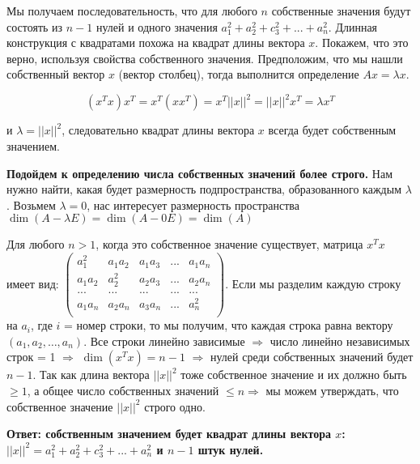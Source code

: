 \documentclass[a4paper,12pt]{article}
\renewcommand{\leq}{\leqslant}
\renewcommand{\geq}{\geqslant}
\begin{document}
\begin{enumerate}
Мы получаем последовательность, что для любого $n$ собственные значения будут состоять из $n-1$ нулей и одного значения $a_1^2 + a_2^2 + c_3^2+...+a^2_n$.
Длинная конструкция с квадратами похожа на квадрат длины вектора $x$. Покажем, что это верно, используя свойства собственного значения. Предположим, что мы нашли собственный вектор $x$ (вектор столбец), тогда выполнится определение $Ax=\lambda x$.


$$(x^Tx)x^T = x^T(xx^T)=x^T{||x||}^2={||x||}^2x^T=\lambda x^T$$

и $\lambda={||x||}^2$, следовательно квадрат длины вектора $x$ всегда будет собственным значением.

\textbf{Подойдем к определению числа собственных значений более строго.}
Нам нужно найти, какая будет размерность подпространства, образованного каждым $\lambda$. Возьмем $\lambda = 0$, нас интересует размерность пространства $\dim (A - \lambda E)= \dim (A - 0 E)=\dim (A)$

Для любого $n>1$, когда это собственное значение существует, матрица $x^T x$ имеет вид: $\begin{pmatrix}
a_1^2&a_1 a_2&a_1 a_3& ... & a_1 a_n\\
a_1 a_2&a_2^2& a_2 a_3& ... & a_2 a_n\\
... &... &... & ... & ... \\
a_1 a_n&a_2 a_n&a_3 a_n& ... & a_n^2\\
\end{pmatrix}$. Если мы разделим каждую строку на $a_i$, где $i$ = номер строки, то мы получим, что каждая строка равна вектору $(a_1, a_2,\ldots,a_n)$. Все строки линейно зависимые $\Rightarrow$ число линейно независимых строк = 1 $\Rightarrow$ $\dim (x^T x)=n-1 $ $\Rightarrow$ нулей среди собственных значений будет $n-1$. Так как длина вектора ${||x||}^2$ тоже собственное значение и их должно быть $\geq 1$, а общее число собственных значений $\leq n \Rightarrow$ мы можем утверждать, что собственное значение ${||x||}^2$  строго одно.

\textbf{Ответ: собственным значением будет квадрат длины вектора $x$: ${||x||}^2=a_1^2 + a_2^2 + c_3^2+...+a^2_n$ и $n-1$ штук нулей.}

\end{enumerate}
\end{document}
